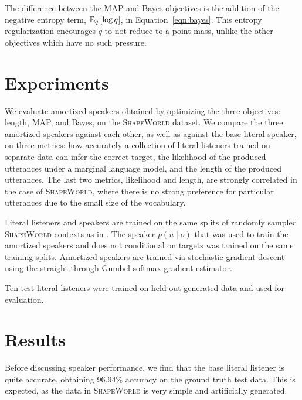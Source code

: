 \documentclass[11pt,a4paper]{article}
\begin{document}
The difference between the MAP and Bayes objectives is the addition of 
the negative entropy term, $\mathbb{E}_{q}\left[\log q\right]$, in Equation~\ref{eqn:bayes}.
This entropy regularization encourages $q$ to not reduce to a point mass,
unlike the other objectives which have no such pressure.

\section{Experiments}
We evaluate amortized speakers obtained by optimizing the 
three objectives: length, MAP, and Bayes, on the \textsc{ShapeWorld} dataset.
We compare the three amortized speakers against each other, as well as against
the base literal speaker, on three metrics:
how accurately a collection of literal listeners trained on separate data
can infer the correct target,
the likelihood of the produced utterances under a marginal language model,
and the length of the produced utterances.
The last two metrics, likelihood and length, are strongly correlated in the case of 
\textsc{ShapeWorld}, where there is no strong preference for particular utterances
due to the small size of the vocabulary.

Literal listeners and speakers are trained on the same splits of randomly sampled
\textsc{ShapeWorld} contexts as in \citep{white2020learning}.
The speaker $p(u \mid o)$ that was used to train the amortized speakers and
does not conditional on targets was trained on the same training splits.
Amortized speakers are trained via stochastic gradient descent using the
straight-through Gumbel-softmax gradient estimator.

Ten test literal listeners were trained on held-out generated data and used for evaluation.

\section{Results}
Before discussing speaker performance,
we find that the base literal listener is quite accurate, obtaining 96.94\% accuracy
on the ground truth test data.
This is expected, as the data in \textsc{ShapeWorld} is very simple and artificially generated.
\end{document}
